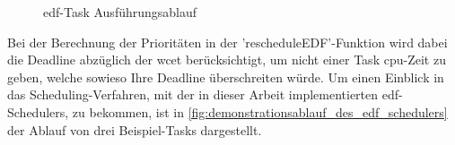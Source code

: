 \documentclass[../EDF Master Thesis.tex]{subfiles}
\begin{document}
    \begin{figure}[ht!]
        \begin{center}
        \end{center}
        \caption{\ac{edf}-Task Ausführungsablauf}
        \label{fig:edf_task_ausfuehrungsablauf}
    \end{figure}
    
    Bei der Berechnung der Prioritäten in der 'rescheduleEDF'-Funktion wird dabei die Deadline abzüglich der \ac{wcet} berücksichtigt, um nicht einer Task \ac{cpu}-Zeit zu geben, welche sowieso Ihre Deadline überschreiten würde.
    Um einen Einblick in das Scheduling-Verfahren, mit der in dieser Arbeit implementierten \ac{edf}-Schedulers, zu bekommen, ist in \autoref{fig:demonstrationsablauf_des_edf_schedulers} der Ablauf von drei Beispiel-Tasks dargestellt.
\end{document}
